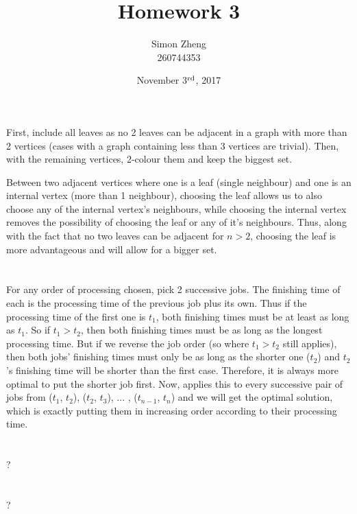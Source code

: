 \documentclass[11pt,letterpaper]{article}
\author{Simon Zheng\\260744353}
\title{Homework 3}
\date{November 3$^{\textnormal{rd}}$, 2017}
\begin{document}
	\maketitle
	\thispagestyle{fancy}
	
	\section{}
		First, include all leaves as no 2 leaves can be adjacent in a graph with more than 2 vertices (cases with a graph containing less than 3 vertices are trivial). Then, with the remaining vertices, 2-colour them and keep the biggest set.
		
		Between two adjacent vertices where one is a leaf (single neighbour) and one is an internal vertex (more than 1 neighbour), choosing the leaf allows us to also choose any of the internal vertex's neighbours, while choosing the internal vertex removes the possibility of choosing the leaf or any of it's neighbours.
		Thus, along with the fact that no two leaves can be adjacent for $n>2$, choosing the leaf is more advantageous and will allow for a bigger set.
		
	\section{}
		For any order of processing chosen, pick 2 successive jobs.
		The finishing time of each is the processing time of the previous job plus its own. Thus if the processing time of the first one is $t_1$, both finishing times must be at least as long as $t_1$.
		So if $t_1 > t_2$, then both finishing times must be as long as the longest processing time.
		But if we reverse the job order (so where $t_1 > t_2$ still applies), then both jobs' finishing times must only be as long as the shorter one ($t_2$) and $t_2$'s finishing time will be shorter than the first case.
		Therefore, it is always more optimal to put the shorter job first.
		Now, applies this to every successive pair of jobs from ($t_1$, $t_2$), ($t_2$, $t_3$), ... , ($t_{n-1}$, $t_n$) and we will get the optimal solution, which is exactly putting them in increasing order according to their processing time.
		
	\section{}
		?
		
	\section{}
		?
		
\end{document}
